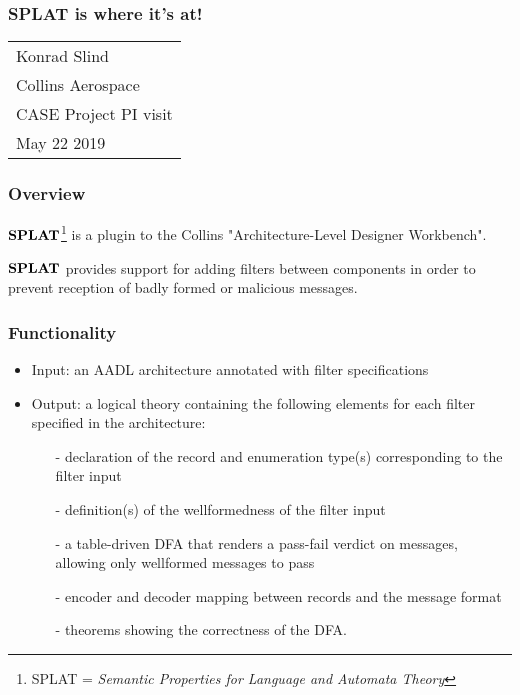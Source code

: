 \documentclass{beamer}
\newcommand{\konst}[1]{\ensuremath{\mbox{\bf{#1}}}}
\begin{document}
\begin{frame}\frametitle{SPLAT is where it's at!}

\hspace{50mm}
{\small
\begin{tabular}{l}
Konrad Slind \\ Collins Aerospace \\ CASE Project PI visit \\ May 22 2019
\end{tabular}
}

\end{frame}

\begin{frame}\frametitle{Overview}

\konst{SPLAT}\footnote{SPLAT = \textit{Semantic Properties for Language and Automata Theory}} is a plugin to the Collins "Architecture-Level Designer
Workbench".

\vspace{10mm}

\konst{SPLAT} provides support for adding filters between components
in order to prevent reception of badly formed or malicious messages.

\end{frame}

\begin{frame}\frametitle{Functionality}

\begin{itemize}
  \item Input: an AADL architecture annotated with filter specifications
\vspace*{5mm}
  \item Output: a logical theory containing the
following elements for each filter specified in the architecture:

\begin{itemize}

  \item[-] declaration of the record and enumeration type(s) corresponding to 
    the filter input

  \item[-] definition(s) of the wellformedness of the filter input

  \item[-] a table-driven DFA that renders a pass-fail verdict on messages,
    allowing only wellformed messages to pass

  \item[-] encoder and decoder mapping between records and the message format

  \item[-] theorems showing the correctness of the DFA.

\end{itemize}
\end{itemize}
\end{frame}
\end{document}
